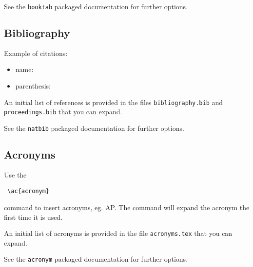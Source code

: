 \documentclass{ceurart}
\begin{document}
See the \texttt{booktab} packaged documentation for further options.

\subsection{Bibliography}

Example of citations:
\begin{itemize}
	\item name: \citet{Salton1968}
	\item parenthesis: \citep{Salton1968}
\end{itemize}

An initial list of references is provided in the files \texttt{bibliography.bib} and \texttt{proceedings.bib} that you can expand.

See the \texttt{natbib} packaged documentation for further options.

\subsection{Acronyms}

Use the 

\begin{verbatim}
 \ac{acronym}
 \end{verbatim}

command to insert acronyms, eg. \ac{AP}. The command will expand the acronym the first time it is used.

An initial list of acronyms is provided in the file \texttt{acronyms.tex} that you can expand.

See the \texttt{acronym} packaged documentation for further options.





\end{document}

